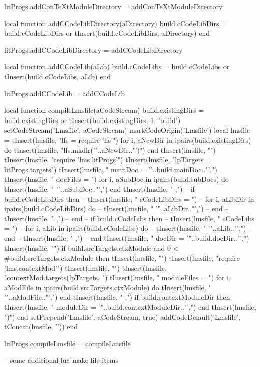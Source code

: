 litProgs.addConTeXtModuleDirectory = addConTeXtModuleDirectory

local function addCCodeLibDirectory(aDirectory)
  build.cCodeLibDirs = build.cCodeLibDirs or { }
  tInsert(build.cCodeLibDirs, aDirectory)
end

litProgs.addCCodeLibDirectory = addCCodeLibDirectory

local function addCCodeLib(aLib)
  build.cCodeLibs = build.cCodeLibs or { }
  tInsert(build.cCodeLibs, aLib)
end

litProgs.addCCodeLib = addCCodeLib
\stopLuaCode

\startMkIVCode
\def\compileLmsfile#1{
  \directlua{
    thirddata.literateProgs.compileLmsfile('#1')
  }
}
\stopMkIVCode

\startLuaCode
local function compileLmsfile(aCodeStream)
  build.existingDirs = build.existingDirs or { }
  tInsert(build.existingDirs, 1, 'build')
  setCodeStream('Lmsfile', aCodeStream)
  markCodeOrigin('Lmsfile')
  local lmsfile = {}
  tInsert(lmsfile, "lfs = require 'lfs'\n")
  for i, aNewDir in ipairs(build.existingDirs) do
    tInsert(lmsfile, "lfs.mkdir('"..aNewDir.."')")
  end
  tInsert(lmsfile, "")
  tInsert(lmsfile, "require 'lms.litProgs'\n")
  tInsert(lmsfile, "lpTargets = litProgs.targets{")
  tInsert(lmsfile, "  mainDoc  = '"..build.mainDoc.."',")
  tInsert(lmsfile, "  docFiles = {")
  for i, aSubDoc in ipairs(build.subDocs) do
    tInsert(lmsfile, "    '"..aSubDoc.."',")
  end
  tInsert(lmsfile, "  },")
--  if build.cCodeLibDirs then 
--    tInsert(lmsfile, "  cCodeLibDirs = {")
--    for i, aLibDir in ipairs(build.cCodeLibDirs) do
--      tInsert(lmsfile, "    '"..aLibDir.."',")
--    end
--    tInsert(lmsfile, "  },")
--  end
--  if build.cCodeLibs then 
--    tInsert(lmsfile, "  cCodeLibs = {")
--    for i, aLib in ipairs(build.cCodeLibs) do
--      tInsert(lmsfile, "    '"..aLib.."',")
--    end
--    tInsert(lmsfile, "  },")
--  end
  tInsert(lmsfile, "  docDir    = '"..build.docDir.."',")
  tInsert(lmsfile, "}")
  if build.srcTargets.ctxModule and 0 < #build.srcTargets.ctxModule then
    tInsert(lmsfile, "")
    tInsert(lmsfile, "require 'lms.contextMod'")
    tInsert(lmsfile, "")
    tInsert(lmsfile, "contextMod.targets(lpTargets, {")
      tInsert(lmsfile, "  moduleFiles = {")
      for i, aModFile in ipairs(build.srcTargets.ctxModule) do
        tInsert(lmsfile, "    '"..aModFile.."',")
      end
      tInsert(lmsfile, "  },")
      if build.contextModuleDir then
        tInsert(lmsfile, "  moduleDir = '"..build.contextModuleDir.."',")
      end
    tInsert(lmsfile, "})")
  end
  setPrepend('Lmsfile', aCodeStream, true)
  addCodeDefault('Lmsfile', tConcat(lmsfile, '\n'))
end

litProgs.compileLmsfile = compileLmsfile
\stopLuaCode

\startLmsfile
-- some additional lua make file items
\stopLmsfile

\stopchapter
